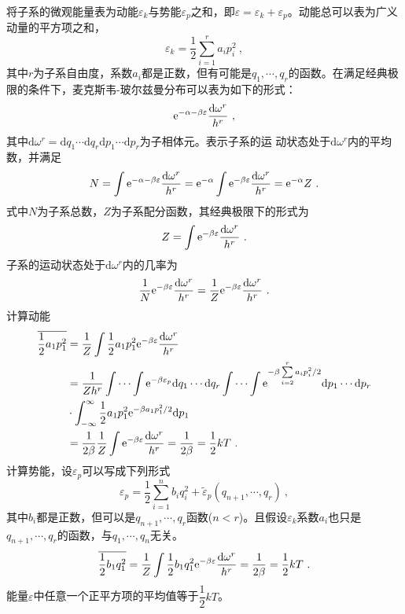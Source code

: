 \documentclass[12pt,a4paper]{article}
\newcommand{\dif}{\mathrm{d}}
\begin{document}
将子系的微观能量表为动能$ \varepsilon_k$与势能$ \varepsilon_p$之和，即$\varepsilon =  \varepsilon_k + \varepsilon_p$。动能总可以表为广义动量的平方项之和，
\begin{equation}
 \varepsilon_k = \dfrac{1}{2} \sum\limits_{i=1}^r a_i p^2_i ~,
\end{equation}
其中$r$为子系自由度，系数$a_i$都是正数，但有可能是$q_1, \cdots, q_r$的函数。在满足经典极限的条件下，麦克斯韦-玻尔兹曼分布可以表为如下的形式：
\begin{equation*}
{\rm e}^{-\alpha -\beta  \varepsilon} \dfrac{\dif \omega^r}{h^r} ~,
\end{equation*}
其中$\dif \omega^r = \dif q_1 \cdots \dif q_r \dif p_1 \cdots \dif p_r$为子相体元。表示子系的运 动状态处于$\dif \omega^r$内的平均数，并满足
\begin{equation}
N = \int {\rm e}^{-\alpha -\beta  \varepsilon} \dfrac{\dif \omega^r}{h^r} = {\rm e}^{-\alpha} \int {\rm e}^{-\beta  \varepsilon} \dfrac{\dif \omega^r}{h^r} = {\rm e}^{-\alpha} Z ~.
\end{equation}
式中$N$为子系总数，$Z$为子系配分函数，其经典极限下的形式为
\begin{equation}
Z = \int {\rm e}^{-\beta  \varepsilon} \dfrac{\dif \omega^r}{h^r} ~.
\end{equation}
子系的运动状态处于$\dif \omega^r$内的几率为
\begin{equation}
\dfrac{1}{N} {\rm e}^{-\beta  \varepsilon} \dfrac{\dif \omega^r}{h^r} = \dfrac{1}{Z} {\rm e}^{-\beta  \varepsilon} \dfrac{\dif \omega^r}{h^r} ~.
\end{equation}
计算动能
\begin{align}
\nonumber \overline{\dfrac{1}{2} a_1 p^2_1} &= \dfrac{1}{Z} \int \dfrac{1}{2} a_1 p^2_1 {\rm e}^{-\beta  \varepsilon} \dfrac{\dif \omega^r}{h^r}  \\
\nonumber &= \dfrac{1}{Z h^r} \int \cdots \int {\rm e}^{-\beta  \varepsilon_p} \dif q_1 \cdots \dif q_r \int \cdots \int {\rm e}^{-\beta \sum\limits_{i=2}^r a_i p^2_i/2} \dif p_1 \cdots \dif p_r \\
\nonumber &\cdot \int_{-\infty}^\infty \dfrac{1}{2} a_1 p^2_1 {\rm e}^{-\beta a_1 p^2_1/2} \dif p_1 \\
&= \dfrac{1}{2\beta} \dfrac{1}{Z}  \int {\rm e}^{-\beta  \varepsilon} \dfrac{\dif \omega^r}{h^r} = \dfrac{1}{2\beta} = \dfrac{1}{2} kT ~.
\end{align}
计算势能，设$ \varepsilon_p$可以写成下列形式
\begin{equation}
\varepsilon_p = \dfrac{1}{2} \sum\limits_{i=1}^n b_i q^2_i + \tilde{\varepsilon}_p(q_{n+1}, \cdots, q_r) ~,
\end{equation}
其中$b_i$都是正数，但可以是$q_{n+1}, \cdots, q_r$函数($n<r$)。且假设$\varepsilon_k$系数$a_i$也只是$q_{n+1}, \cdots, q_r$的函数，与$q_{1}, \cdots, q_n$无关。
\begin{equation}
\nonumber \overline{\dfrac{1}{2} b_1 q^2_1} = \dfrac{1}{Z} \int \dfrac{1}{2} b_1 q^2_1 {\rm e}^{-\beta  \varepsilon} \dfrac{\dif \omega^r}{h^r} = \dfrac{1}{2\beta} = \dfrac{1}{2} kT ~.
\end{equation}
能量$\varepsilon$中任意一个正平方项的平均值等于$\dfrac{1}{2} kT$。
\end{document}
